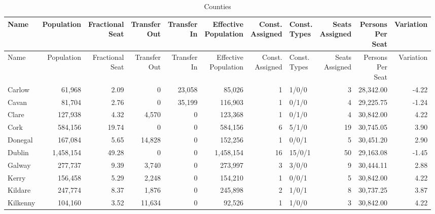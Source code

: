 \documentclass[a4paper]{article}
\begin{document}
\begin{longtable}{lrrrrrrlrrr}
\caption{Counties}
\\ \toprule
Name &Population &\shortstack{Fractional\\Seat} &\shortstack{Transfer\\Out} &\shortstack{Transfer\\In} &\shortstack{Effective\\Population} &\shortstack{Const.\\Assigned} &\shortstack{Const.\\Types} &\shortstack{Seats\\Assigned} &\shortstack{Persons\\Per\\Seat} &Variation \\ \midrule
\endfirsthead
\toprule
Name &Population &\shortstack{Fractional\\Seat} &\shortstack{Transfer\\Out} &\shortstack{Transfer\\In} &\shortstack{Effective\\Population} &\shortstack{Const.\\Assigned} &\shortstack{Const.\\Types} &\shortstack{Seats\\Assigned} &\shortstack{Persons\\Per\\Seat} &Variation \\ \midrule
\endhead
\bottomrule
\endfoot
Carlow&61,968& 2.09&0&23,058&85,026&1&1/0/0&3&28,342.00&-4.22\\ 
Cavan&81,704& 2.76&0&35,199&116,903&1&0/1/0&4&29,225.75&-1.24\\ 
Clare&127,938& 4.32&4,570&0&123,368&1&0/1/0&4&30,842.00& 4.22\\ 
Cork&584,156&19.74&0&0&584,156&6&5/1/0&19&30,745.05& 3.90\\ 
Donegal&167,084& 5.65&14,828&0&152,256&1&0/0/1&5&30,451.20& 2.90\\ 
Dublin&1,458,154&49.28&0&0&1,458,154&16&15/0/1&50&29,163.08&-1.45\\ 
Galway&277,737& 9.39&3,740&0&273,997&3&3/0/0&9&30,444.11& 2.88\\ 
Kerry&156,458& 5.29&2,248&0&154,210&1&0/0/1&5&30,842.00& 4.22\\ 
Kildare&247,774& 8.37&1,876&0&245,898&2&1/0/1&8&30,737.25& 3.87\\ 
Kilkenny&104,160& 3.52&11,634&0&92,526&1&1/0/0&3&30,842.00& 4.22\\ 

\end{longtable}
\end{document}
